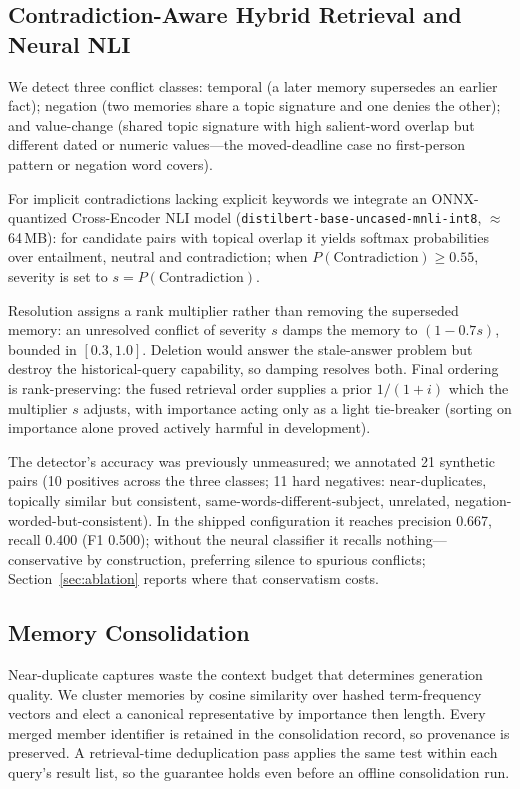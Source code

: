\documentclass[conference]{IEEEtran}
\begin{document}
\subsection{Contradiction-Aware Hybrid Retrieval and Neural NLI}
\label{sec:conflict}
We detect three conflict classes: temporal (a later memory supersedes an earlier fact); negation (two memories share a topic signature and one denies the other); and value-change (shared topic signature with high salient-word overlap but different dated or numeric values---the moved-deadline case no first-person pattern or negation word covers).

For implicit contradictions lacking explicit keywords we integrate an ONNX-quantized Cross-Encoder NLI model (\texttt{distilbert-base-uncased-mnli-int8}, $\approx$64\,MB): for candidate pairs with topical overlap it yields softmax probabilities over entailment, neutral and contradiction; when $P(\mathrm{Contradiction}) \geq 0.55$, severity is set to $s = P(\mathrm{Contradiction})$.

Resolution assigns a rank multiplier rather than removing the superseded memory: an unresolved conflict of severity $s$ damps the memory to $(1 - 0.7s)$, bounded in $[0.3, 1.0]$. Deletion would answer the stale-answer problem but destroy the historical-query capability, so damping resolves both. Final ordering is rank-preserving: the fused retrieval order supplies a prior $1 / (1 + i)$ which the multiplier $s$ adjusts, with importance acting only as a light tie-breaker (sorting on importance alone proved actively harmful in development).

The detector's accuracy was previously unmeasured; we annotated 21 synthetic pairs (10 positives across the three classes; 11 hard negatives: near-duplicates, topically similar but consistent, same-words-different-subject, unrelated, negation-worded-but-consistent). In the shipped configuration it reaches precision 0.667, recall 0.400 (F1 0.500); without the neural classifier it recalls nothing---conservative by construction, preferring silence to spurious conflicts; Section~\ref{sec:ablation} reports where that conservatism costs.

\subsection{Memory Consolidation}
Near-duplicate captures waste the context budget that determines generation quality. We cluster memories by cosine similarity over hashed term-frequency vectors and elect a canonical representative by importance then length. Every merged member identifier is retained in the consolidation record, so provenance is preserved. A retrieval-time deduplication pass applies the same test within each query's result list, so the guarantee holds even before an offline consolidation run.
\end{document}
